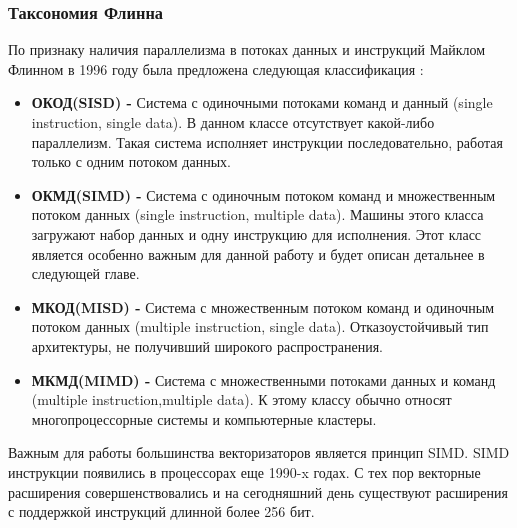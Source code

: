 \subsubsection{Таксономия Флинна}
По признаку наличия параллелизма в потоках данных и инструкций Майклом Флинном в 1996 году была предложена следующая классификация \cite{skillicorn1988taxonomy}:
\begin{itemize}
  \item \textbf{ОКОД(SISD) - } Система с одиночными потоками команд и данный (single instruction, single data). В данном классе отсутствует какой-либо параллелизм. Такая система исполняет инструкции последовательно, работая только с одним потоком данных.
  
  \item \textbf{ОКМД(SIMD) - } Система с одиночным потоком команд и множественным потоком данных (single instruction, multiple data). Машины этого класса загружают набор данных и одну инструкцию для исполнения. Этот класс является особенно важным для данной работу и будет описан детальнее в следующей главе.
  
  \item  \textbf{МКОД(MISD) -} Система с множественным потоком команд и одиночным потоком данных (multiple instruction, single data). Отказоустойчивый тип архитектуры, не получивший широкого распространения.
  
  \item  \textbf{МКМД(MIMD) -} Система с множественными потоками данных и команд (multiple instruction,multiple data). К этому классу обычно относят многопроцессорные системы и компьютерные кластеры. 
\end{itemize}

Важным для работы большинства векторизаторов является принцип SIMD. SIMD инструкции появились в процессорах еще 1990-x годах. С тех пор векторные расширения совершенствовались и на сегодняшний день существуют расширения с поддержкой инструкций длинной более 256 бит.

\newpage
